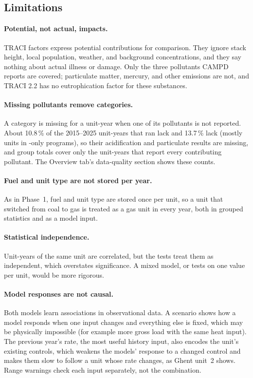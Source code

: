 \documentclass[11pt,a4paper]{article}
\begin{document}
\subsection{Limitations}

\paragraph{Potential, not actual, impacts.} TRACI factors express potential contributions for
comparison. They ignore stack height, local population, weather, and background
concentrations, and they say nothing about actual illness or damage. Only the three pollutants
CAMPD reports are covered; particulate matter, mercury, and other emissions are not, and TRACI
2.2 has no eutrophication factor for these substances.

\paragraph{Missing pollutants remove categories.} A category is missing for a unit-year when one
of its pollutants is not reported. About 10.8\,\% of the 2015--2025 unit-years that ran lack
\SOtwo{} and 13.7\,\% lack \COtwo{} (mostly units in \NOx{}-only programs), so
their acidification and particulate results are missing, and group totals cover only the
unit-years that report every contributing pollutant. The Overview tab's data-quality section shows these counts.

\paragraph{Fuel and unit type are not stored per year.} As in Phase~1, fuel and unit type are
stored once per unit, so a unit that switched from coal to gas is treated as a gas unit in every
year, both in grouped statistics and as a model input.

\paragraph{Statistical independence.} Unit-years of the same unit are correlated, but the tests
treat them as independent, which overstates significance. A mixed model, or tests on one value
per unit, would be more rigorous.

\paragraph{Model responses are not causal.} Both models learn associations in observational data.
A scenario shows how a model responds when one input changes and everything else is fixed, which
may be physically impossible (for example more gross load with the same heat input). The
previous year's \NOx{} rate, the most useful history input, also encodes the unit's existing
controls, which weakens the models' response to a changed control and makes them slow to follow
a unit whose rate changes, as Ghent unit~2 shows. Range warnings check each input separately,
not the combination.
\end{document}
